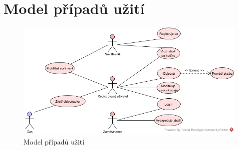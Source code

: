 \documentclass[12pt, a4paper]{article}
\begin{document}
\newpage
\section{Model případů užití}


 \begin{figure}[!ht]
    \centering
    \includegraphics[width=1\linewidth]{use_case_diagram.jpg}
    \caption{Model případů užití}
    \label{figure:ast_example1}
\end{figure}
\end{document}
